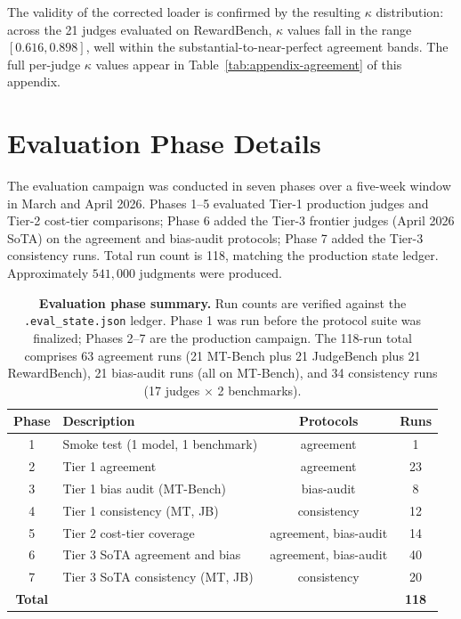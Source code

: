 The validity of the corrected loader is confirmed by the resulting
$\kappa$ distribution: across the 21 judges evaluated on RewardBench,
$\kappa$ values fall in the range $[0.616, 0.898]$, well within the
substantial-to-near-perfect agreement bands. The full per-judge
$\kappa$ values appear in Table~\ref{tab:appendix-agreement} of this
appendix.


\clearpage
\section{Evaluation Phase Details}
\label{app:phases}

The evaluation campaign was conducted in seven phases over a
five-week window in March and April 2026. Phases 1--5 evaluated
Tier-1 production judges and Tier-2 cost-tier comparisons; Phase 6
added the Tier-3 frontier judges (April 2026 SoTA) on the agreement
and bias-audit protocols; Phase 7 added the Tier-3 consistency runs.
Total run count is 118, matching the production state ledger.
Approximately $541{,}000$ judgments were produced.

\begin{table}[!t]
\centering
\small
\begin{tabular}{clcc}
\toprule
\textbf{Phase} & \textbf{Description} & \textbf{Protocols} & \textbf{Runs} \\
\midrule
1 & Smoke test (1 model, 1 benchmark) & agreement & 1 \\
2 & Tier 1 agreement & agreement & 23 \\
3 & Tier 1 bias audit (MT-Bench) & bias-audit & 8 \\
4 & Tier 1 consistency (MT, JB) & consistency & 12 \\
5 & Tier 2 cost-tier coverage & agreement, bias-audit & 14 \\
6 & Tier 3 SoTA agreement and bias & agreement, bias-audit & 40 \\
7 & Tier 3 SoTA consistency (MT, JB) & consistency & 20 \\
\midrule
\textbf{Total} & & & \textbf{118} \\
\bottomrule
\end{tabular}
\caption{\textbf{Evaluation phase summary.} Run counts are verified
against the \texttt{.eval\_state.json} ledger. Phase 1 was run before
the protocol suite was finalized; Phases 2--7 are the production
campaign. The 118-run total comprises 63 agreement runs (21 MT-Bench
plus 21 JudgeBench plus 21 RewardBench), 21 bias-audit runs (all on
MT-Bench), and 34 consistency runs (17 judges $\times$ 2 benchmarks).}
\label{tab:appendix-phases}
\end{table}

